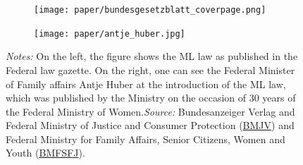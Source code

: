 \documentclass[11pt, a4paper, draft]{article} %
\begin{document}
\renewcommand\thefigure{A\arabic{figure}}
\setcounter{figure}{0} 
\captionsetup[subfigure]{labelformat=parens}
\vspace*{\fill}
\begin{figure}[H]\centering
	\caption{Introduction of the maternity leave law}\label{fig: bundesgesetzblatt_antjehuber}
	\begin{subfigure}[h]{0.48\linewidth}\centering%
		\texttt{[image: paper/bundesgesetzblatt\_coverpage.png]}
	\end{subfigure}
	\begin{subfigure}[h]{0.48\linewidth}\centering%
		\texttt{[image: paper/antje\_huber.jpg]}
	\end{subfigure}
	\begin{minipage}{\linewidth}
		\scriptsize{\emph{Notes:} On the left, the figure shows the ML law as published in the Federal law gazette. On the right, one can see the Federal Minister of Family affairs Antje Huber at the introduction of the ML law, which was published by the Ministry on the occasion of 30 years of the Federal Ministry of Women.\newline \emph{Source:} Bundesanzeiger Verlag and Federal Ministry of Justice and Consumer Protection (\hyperlink{http://www.bgbl.de/xaver/bgbl/start.xav?startbk=Bundesanzeiger_BGBl&jumpTo=bgbl179s0797.pdf}{BMJV}) and Federal Ministry for Family Affairs, Senior Citizens, Women and Youth (\hyperlink{https://twitter.com/bmfsfj/status/745513281989677058}{BMFSFJ}).}
	\end{minipage}
\end{figure}
\vspace*{\fill}\clearpage
\end{document}
